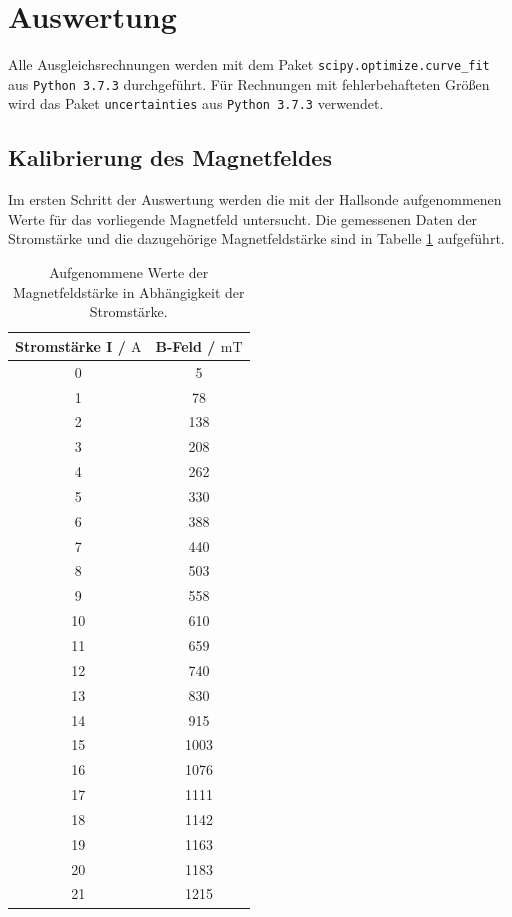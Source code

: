 \section{Auswertung}
Alle Ausgleichsrechnungen werden mit dem Paket \texttt{scipy.optimize.curve\_fit}  aus \texttt{Python 3.7.3} durchgeführt.
Für Rechnungen mit fehlerbehafteten Größen wird das Paket \texttt{uncertainties} aus \texttt{Python 3.7.3} verwendet.

\subsection{Kalibrierung des Magnetfeldes}
Im ersten Schritt der Auswertung werden die mit der Hallsonde aufgenommenen Werte für das
vorliegende Magnetfeld untersucht. Die gemessenen Daten der Stromstärke und die dazugehörige
Magnetfeldstärke sind in Tabelle \ref{Tab:Messwerte} aufgeführt.
\begin{table}[H]
    \centering
    \caption{Aufgenommene Werte der Magnetfeldstärke in Abhängigkeit der Stromstärke.}
    \label{Tab:Messwerte}
    \begin{tabular}{cc}
      \toprule
      Stromstärke I / $\si{\ampere}$ & B-Feld / $\si{\milli\tesla}$  \\
      \midrule
      0 &    5 \\
      1 &   78 \\
      2 &  138 \\
      3 &  208 \\
      4 &  262 \\
      5 &  330 \\
      6 &  388 \\
      7 &  440 \\
      8 &  503 \\
      9 &  558 \\
     10 &  610 \\
     11 &  659 \\
     12 &  740 \\
     13 &  830 \\
     14 &  915 \\
     15 & 1003 \\
     16 & 1076 \\
     17 & 1111 \\
     18 & 1142 \\
     19 & 1163 \\
     20 & 1183 \\
     21 & 1215 \\
      \bottomrule
  \end{tabular}
 \end{table} \noindent

